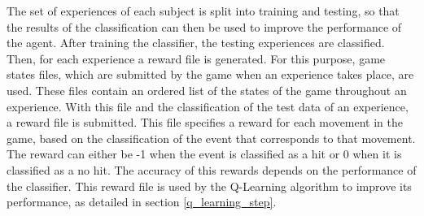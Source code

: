 \documentclass[journal]{IEEEtran}
\begin{document}
The set of experiences of each subject is split into training and testing, so that the results of the classification can then be used to improve the performance of the agent. After training the classifier, the testing experiences are classified. Then, for each experience a reward file is generated. For this purpose, game states files, which are submitted by the game when an experience takes place, are used. These files contain an ordered list of the states of the game throughout an experience. With this file and the classification of the test data of an experience, a reward file is submitted. This file specifies a reward for each movement in the game, based on the classification of the event that corresponds to that movement. The reward can either be -1 when the event is classified as a hit or 0 when it is classified as a no hit. The accuracy of this rewards depends on the performance of the classifier. This reward file is used by the Q-Learning algorithm to improve its performance, as detailed in section \ref{q_learning_step}.
\end{document}

